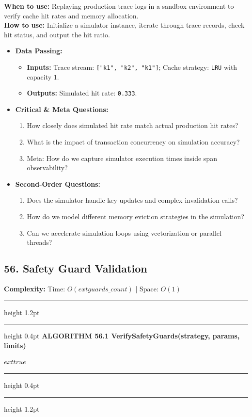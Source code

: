 \documentclass[11pt,a4paper]{article}
\newenvironment{textbookalgo}[2]{%
  \par\addvspace{1.2em}\noindent
  \hrule height 1.2pt
  \vspace{1.5pt}
  \hrule height 0.4pt
  \vspace{5pt}
  {\noindent\large\bfseries\sffamily ALGORITHM #1 \quad #2}
  \par\vspace{5pt}
  \RestyleAlgo{plain}
}{%
  \par\vspace{4pt}
  \hrule height 0.4pt
  \vspace{1.5pt}
  \hrule height 1.2pt
  \par\addvspace{1.2em}
}
\theoremstyle{definition}
\begin{document}
\noindent
\textbf{When to use:} Replaying production trace logs in a sandbox environment to verify cache hit rates and memory allocation.\\
\textbf{How to use:} Initialize a simulator instance, iterate through trace records, check hit status, and output the hit ratio.
\begin{itemize}[leftmargin=*]
  \item[] \textbf{Data Passing:}
    \begin{itemize}
      \item \textbf{Inputs:} Trace stream: \texttt{["k1", "k2", "k1"]}; Cache strategy: \texttt{LRU} with capacity $1$.
      \item \textbf{Outputs:} Simulated hit rate: \texttt{0.333}.
    \end{itemize}
  \item[] \textbf{Critical \& Meta Questions:}
  \begin{enumerate}
    \item How closely does simulated hit rate match actual production hit rates?
    \item What is the impact of transaction concurrency on simulation accuracy?
    \item Meta: How do we capture simulator execution times inside span observability?
  \end{enumerate}
  \item[] \textbf{Second-Order Questions:}
  \begin{enumerate}
    \item Does the simulator handle key updates and complex invalidation calls?
    \item How do we model different memory eviction strategies in the simulation?
    \item Can we accelerate simulation loops using vectorization or parallel threads?
  \end{enumerate}
\end{itemize}
\medskip

\clearpage
\subsection{56. Safety Guard Validation}


\noindent
\textbf{Complexity:} Time: $O(	ext{guards\_count})$ | Space: $O(1)$
\smallskip

\begin{textbookalgo}{56.1}{VerifySafetyGuards(strategy, params, limits)}
\begin{algorithm}[H]
\Return $	ext{true}$\;
\end{algorithm}
\end{textbookalgo}
\end{document}
